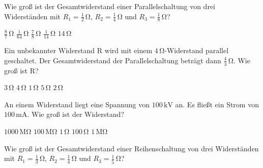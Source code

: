 \documentclass[11pt]{exam}
\begin{document}
\setlength{\voffset}{-0.5in}
\setlength{\headsep}{5pt}

\hspace{2mm}
 \hspace{5mm}
\vspace{4mm}

\begin{questions}

\question Wie groß ist der Gesamtwiderstand einer Parallelschaltung von drei Widerständen mit \(R_1=\mathrm{\frac{1}{2}\,\Omega}\), \(R_2=\mathrm{\frac{1}{4}\,\Omega}\) und \(R_3=\mathrm{\frac{1}{8}\,\Omega}\)?

\begin{choices}
	\choice \(\mathrm{\frac{8}{7}\,\Omega}\)
	\choice \(\mathrm{\frac{1}{64}\,\Omega}\)
	\choice \(\mathrm{\frac{7}{8}\,\Omega}\)
	\choice \(\mathrm{\frac{1}{14}\,\Omega}\)
	\choice \(\mathrm{14\,\Omega}\)
\end{choices}

\vspace{3mm}\question Ein unbekannter Widerstand \(\mathrm{R}\) wird mit einem \(\mathrm{4\,\Omega}\)-Widerstand parallel geschaltet. Der Gesamtwiderstand der Parallelschaltung beträgt dann \(\mathrm{\frac{4}{3}\,\Omega}\). Wie groß ist \(\mathrm{R}\)?

\begin{choices}
	\choice \(\mathrm{3\,\Omega}\)
	\choice \(\mathrm{4\,\Omega}\)
	\choice \(\mathrm{1\,\Omega}\)
	\choice \(\mathrm{5\,\Omega}\)
	\choice \(\mathrm{2\,\Omega}\)
\end{choices}

\vspace{3mm}\question An einem Widerstand liegt eine Spannung von \(\mathrm{100\,kV}\) an. Es fließt ein Strom von \(\mathrm{100\,mA}\). Wie groß ist der Widerstand?

\begin{choices}
	\choice \(\mathrm{1000\,M\Omega}\)
	\choice \(\mathrm{100\,M\Omega}\)
	\choice \(\mathrm{1\,\Omega}\)
	\choice \(\mathrm{100\,\Omega}\)
	\choice \(\mathrm{1\,M\Omega}\)
\end{choices}

\vspace{3mm}\question Wie groß ist der Gesamtwiderstand einer Reihenschaltung von drei Widerständen mit \(R_1=\mathrm{\frac{1}{3}\,\Omega}\), \(R_2=\mathrm{\frac{1}{4}\,\Omega}\) und \(R_3=\mathrm{\frac{1}{5}\,\Omega}\)?


\end{questions}
\end{document}
